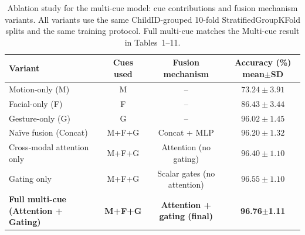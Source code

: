 \begin{table}[htbp]
\centering
\caption{Ablation study for the multi-cue model: cue contributions and fusion mechanism variants. All variants use the same ChildID-grouped 10-fold StratifiedGroupKFold splits and the same training protocol. Full multi-cue matches the Multi-cue result in Tables~1--11.}
\label{tab:ablation}
{\small
\setlength{\tabcolsep}{4pt}
\renewcommand{\arraystretch}{1.05}
\begin{tabular}{lccc}
\toprule
\textbf{Variant} & \textbf{Cues used} & \textbf{Fusion mechanism} & \textbf{Accuracy (\%) mean$\pm$SD} \\
\midrule
Motion-only (M)   & M & -- & $73.24\pm 3.91$ \\
Facial-only (F)   & F & -- & $86.43\pm 3.44$ \\
Gesture-only (G)  & G & -- & $96.02\pm 1.45$ \\
\midrule
Na{\"i}ve fusion (Concat) & M+F+G & Concat + MLP & $96.20\pm 1.32$ \\
Cross-modal attention only & M+F+G & Attention (no gating) & $96.40\pm 1.10$ \\
Gating only & M+F+G & Scalar gates (no attention) & $96.55\pm 1.10$ \\
\textbf{Full multi-cue (Attention + Gating)} & \textbf{M+F+G} & \textbf{Attention + gating (final)} & \textbf{96.76$\pm$1.11} \\
\bottomrule
\end{tabular}
}
\end{table}
